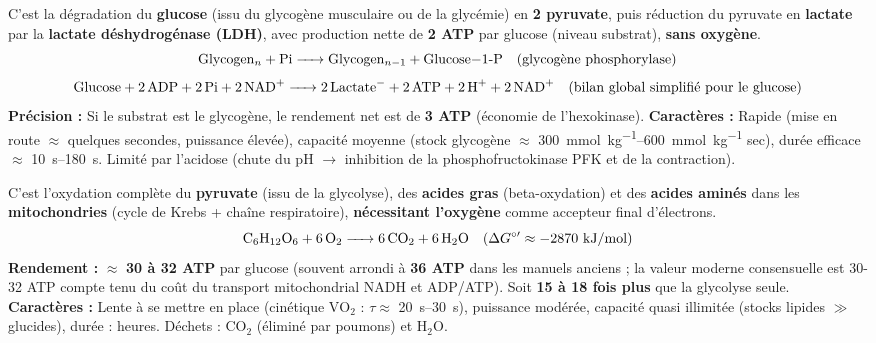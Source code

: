 \documentclass[11pt]{article}
\begin{document}
\begin{definition}
C'est la dégradation du \textbf{glucose} (issu du glycogène musculaire ou de la glycémie) en \textbf{2 pyruvate}, puis réduction du pyruvate en \textbf{lactate} par la \textbf{lactate déshydrogénase (LDH)}, avec production nette de \textbf{2 ATP} par glucose (niveau substrat), \textbf{sans oxygène}.
\[
\ce{Glycogen_n + Pi -> Glycogen_{n-1} + Glucose-1-P} \quad (\text{glycogène phosphorylase})
\]
\[
\ce{Glucose + 2 ADP + 2 Pi + 2 NAD+ -> 2 Lactate- + 2 ATP + 2 H+ + 2 NAD+} \quad (\text{bilan global simplifié pour le glucose})
\]
\textbf{Précision :} Si le substrat est le glycogène, le rendement net est de \textbf{3 ATP} (économie de l'hexokinase).
\textbf{Caractères :} Rapide (mise en route $\approx$ quelques secondes, puissance élevée), capacité moyenne (stock glycogène $\approx$ \SIrange{300}{600}{\milli\mole\per\kilo\gram} sec), durée efficace $\approx$ \SIrange{10}{180}{s}. Limité par l'acidose (chute du pH $\rightarrow$ inhibition de la phosphofructokinase PFK et de la contraction).
\end{definition}

\begin{propriete}
C'est l'oxydation complète du \textbf{pyruvate} (issu de la glycolyse), des \textbf{acides gras} (beta-oxydation) et des \textbf{acides aminés} dans les \textbf{mitochondries} (cycle de Krebs + chaîne respiratoire), \textbf{nécessitant l'oxygène} comme accepteur final d'électrons.
\[
\ce{C6H12O6 + 6 O2 -> 6 CO2 + 6 H2O} \quad (\Delta G^{\circ\prime} \approx -2870\ \text{kJ/mol})
\]
\textbf{Rendement :} $\approx$ \textbf{30 à 32 ATP} par glucose (souvent arrondi à \textbf{36 ATP} dans les manuels anciens ; la valeur moderne consensuelle est 30-32 ATP compte tenu du coût du transport mitochondrial NADH et ADP/ATP). Soit \textbf{15 à 18 fois plus} que la glycolyse seule.
\textbf{Caractères :} Lente à se mettre en place (cinétique $\text{VO}_2$ : $\tau \approx$ \SIrange{20}{30}{s}), puissance modérée, capacité quasi illimitée (stocks lipides $\gg$ glucides), durée : heures. Déchets : $\text{CO}_2$ (éliminé par poumons) et $\text{H}_2\text{O}$.
\end{propriete}
\end{document}

